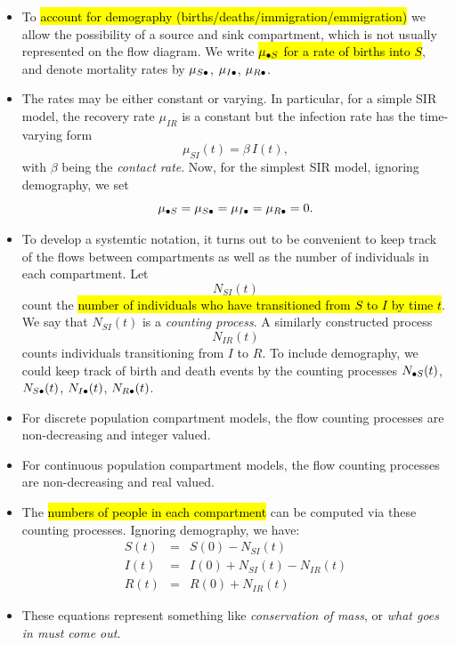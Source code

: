 \documentclass[]{article}
\begin{document}
\begin{itemize}
\item
  To \hl{account for demography (births/deaths/immigration/emmigration)} we
  allow the possibility of a source and sink compartment, which is not
  usually represented on the flow diagram. We write
  \hl{$\mu_{{\small{\bullet}}S}$ for a rate of births into $S$}, and
  denote mortality rates by $\mu_{S{\small\bullet}}$,
  $\mu_{I{\small\bullet}}$, $\mu_{R{\small\bullet}}$.
\item
  The rates may be either constant or varying. In particular, for a
  simple SIR model, the recovery rate \(\mu_{IR}\) is a constant but the
  infection rate has the time-varying form
  \[\mu_{SI}(t)=\beta \, I(t),\] with \(\beta\) being the \emph{contact
  rate}. Now, for the simplest SIR model, ignoring demography, we set
  \[ \mu_{{\small{\bullet}}S}=\mu_{S{\small{\bullet}}}=\mu_{I{\small{\bullet}}}=\mu_{R{\small{\bullet}}}=0.\]
\item
  To develop a systemtic notation, it turns out to be convenient to keep
  track of the flows between compartments as well as the number of
  individuals in each compartment. Let \[N_{SI}(t)\] count the \hl{number of
  individuals who have transitioned from $S$ to $I$ by time $t$}.
  We say that \(N_{SI}(t)\) is a \emph{counting process}. A similarly
  constructed process \[N_{IR}(t)\] counts individuals transitioning
  from \(I\) to \(R\). To include demography, we could keep track of
  birth and death events by the counting processes
  \(N_{{\small{\bullet}} S}(t)\), \(N_{S{\small{\bullet}}}(t)\),
  \(N_{I{\small{\bullet}}}(t)\), \(N_{R{\small{\bullet}}}(t)\).
\item
  For discrete population compartment models, the flow counting
  processes are non-decreasing and integer valued.
\item
  For continuous population compartment models, the flow counting
  processes are non-decreasing and real valued.
\item
  The \hl{numbers of people in each compartment} can be computed via these
  counting processes. Ignoring demography, we have:
  \[\begin{array}{lcl} 
  S(t)&=& S(0) - N_{SI}(t)
  \\
  I(t)&=& I(0) + N_{SI}(t) - N_{IR}(t)
  \\
  R(t) &=& R(0) + N_{IR}(t)
  \end{array}\]
\item
  These equations represent something like \emph{conservation of mass},
  or \emph{what goes in must come out}.
\end{itemize}
\end{document}
